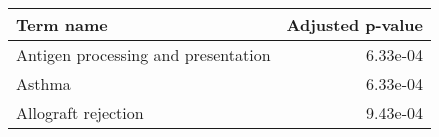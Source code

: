 \begin{tabular}{lr}
\toprule
                          Term name &  Adjusted p-value \\
\midrule
Antigen processing and presentation &          6.33e-04 \\
                             Asthma &          6.33e-04 \\
                Allograft rejection &          9.43e-04 \\
\bottomrule
\end{tabular}
